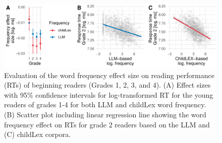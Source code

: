 \documentclass[doc, a4paper, anonymous]{apa7}
\begin{document}
\begin{figure}[!htbp]
    \centering
    \includegraphics[width = .8\paperwidth]{figures/exp1_ef_size.pdf}
    \caption{Evaluation of the word frequency effect size on reading performance (RTs) of beginning readers (Grades 1, 2, 3, and 4). (A) Effect sizes with 95\% confidence intervals for log-transformed RT for the young readers of grades 1-4 for both LLM and childLex word frequency. (B) Scatter plot including linear regression line showing the word frequency effect on RTs for grade 2 readers based on the LLM and (C) childLex corpora.}
\label{fig:ef_size}
\end{figure}
\end{document}

